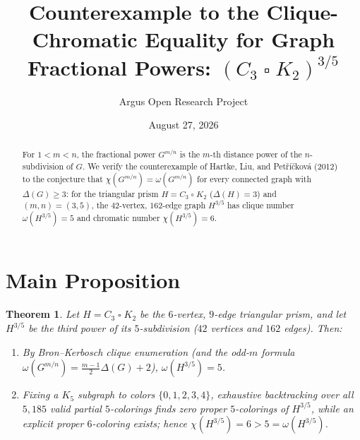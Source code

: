 \documentclass[10pt,reqno]{amsart}
\title[The Fractional Power $(C_3\mathbin{\square} K_2)^{3/5}$ Has $\chi=6 > 5=\omega$]
{Counterexample to the Clique-Chromatic Equality for Graph Fractional Powers: $(C_3\mathbin{\square} K_2)^{3/5}$}
\author{Argus Open Research Project}
\date{August 27, 2026}
\newtheorem{theorem}{Theorem}[section]
\theoremstyle{definition}
\begin{document}
\begin{abstract}
For $1<m<n$, the fractional power $G^{m/n}$ is the $m$-th distance power of the $n$-subdivision of $G$. We verify the counterexample of Hartke, Liu, and Pet\v{r}\'i\v{c}kov\'a (2012) to the conjecture that $\chi(G^{m/n})=\omega(G^{m/n})$ for every connected graph with $\Delta(G)\ge 3$: for the triangular prism $H=C_3\mathbin{\square} K_2$ ($\Delta(H)=3$) and $(m,n)=(3,5)$, the $42$-vertex, $162$-edge graph $H^{3/5}$ has clique number $\omega(H^{3/5})=5$ and chromatic number $\chi(H^{3/5})=6$.
\end{abstract}
\maketitle
\section{Main Proposition}
\begin{theorem}
Let $H=C_3\mathbin{\square} K_2$ be the $6$-vertex, $9$-edge triangular prism, and let $H^{3/5}$ be the third power of its $5$-subdivision ($42$ vertices and $162$ edges). Then:
\begin{enumerate}[label=\textup{(\arabic*)}]
  \item By Bron--Kerbosch clique enumeration (and the odd-$m$ formula $\omega(G^{m/n})=\frac{m-1}{2}\Delta(G)+2$), $\omega(H^{3/5}) = 5$.
  \item Fixing a $K_5$ subgraph to colors $\{0,1,2,3,4\}$, exhaustive backtracking over all $5{,}185$ valid partial $5$-colorings finds zero proper $5$-colorings of $H^{3/5}$, while an explicit proper $6$-coloring exists; hence $\chi(H^{3/5})=6 > 5=\omega(H^{3/5})$.
\end{enumerate}
\end{theorem}
\end{document}
